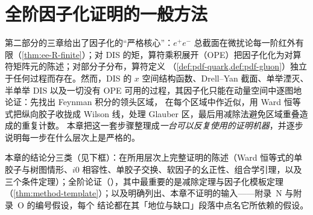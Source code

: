 \chapter{全阶因子化证明的一般方法}\label{ch:method}

第二部分的三章给出了因子化的“严格核心”：$e^+e^-$ 总截面在微扰论每一阶红外有限（\cref{thm:ee-R-finite}）；对 DIS 的矩，算符乘积展开（OPE）把因子化化为对算符矩阵元的陈述；对部分子分布，算符定义
（\cref{def:pdf-quark,def:pdf-gluon}）独立于任何过程而存在。然而，DIS 的 $x$ 空间结构函数、Drell--Yan 截面、单举湮灭、
半单举 DIS 以及一切没有 OPE 可用的过程，其因子化只能在动量空间中逐图地论证：先找出 Feynman 积分的领头区域，
在每个区域中作近似，用 Ward 恒等式把纵向胶子收拢成 Wilson 线，处理 Glauber 区，最后用减除法避免区域重叠造成的重复计数。
本章把这一套步骤整理成\emph{一台可以反复使用的证明机器}，并逐步说明每一步在什么层次上是严格的。

本章的结论分三类（见下框）：在所用层次上完整证明的陈述（Ward 恒等式的单胶子与树图情形、$i0$ 相容性、单胶子交换、软因子的幺正性、组合学引理，以及三个条件定理）；全阶论证（\tagA），其中最重要的是减除定理与因子化模板定理（\cref{thm:method-template}）；以及明确列出、本章不证明的输入——附录~N 与附录~O 的编号假设，每个 \tagA 结论都在其「地位与缺口」段落中点名它所依赖的假设。

